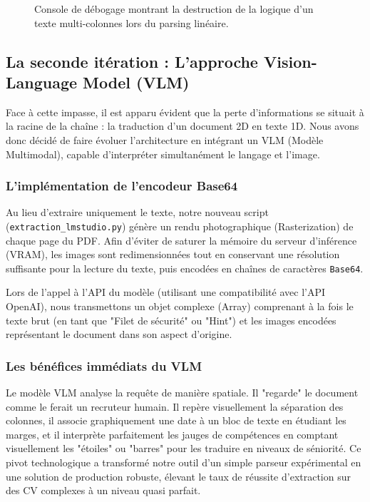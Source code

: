 \begin{figure}[H]
    \centering
    \vspace{7cm} %
    \caption{Console de débogage montrant la destruction de la logique d'un texte multi-colonnes lors du parsing linéaire.}
    \label{fig:llm_failure}
\end{figure}


\subsection{La seconde itération : L'approche Vision-Language Model (VLM)}
Face à cette impasse, il est apparu évident que la perte d'informations se situait à la racine de la chaîne : la traduction d'un document 2D en texte 1D. Nous avons donc décidé de faire évoluer l'architecture en intégrant un VLM (Modèle Multimodal), capable d'interpréter simultanément le langage et l'image.

\subsubsection{L'implémentation de l'encodeur Base64}
Au lieu d'extraire uniquement le texte, notre nouveau script (\texttt{extraction\_lmstudio.py}) génère un rendu photographique (Rasterization) de chaque page du PDF. Afin d'éviter de saturer la mémoire du serveur d'inférence (VRAM), les images sont redimensionnées tout en conservant une résolution suffisante pour la lecture du texte, puis encodées en chaînes de caractères \texttt{Base64}.

Lors de l'appel à l'API du modèle (utilisant une compatibilité avec l'API OpenAI), nous transmettons un objet complexe (Array) comprenant à la fois le texte brut (en tant que "Filet de sécurité" ou "Hint") et les images encodées représentant le document dans son aspect d'origine.

\subsubsection{Les bénéfices immédiats du VLM}
Le modèle VLM analyse la requête de manière spatiale. Il "regarde" le document comme le ferait un recruteur humain. Il repère visuellement la séparation des colonnes, il associe graphiquement une date à un bloc de texte en étudiant les marges, et il interprète parfaitement les jauges de compétences en comptant visuellement les "étoiles" ou "barres" pour les traduire en niveaux de séniorité. Ce pivot technologique a transformé notre outil d'un simple parseur expérimental en une solution de production robuste, élevant le taux de réussite d'extraction sur des CV complexes à un niveau quasi parfait.

